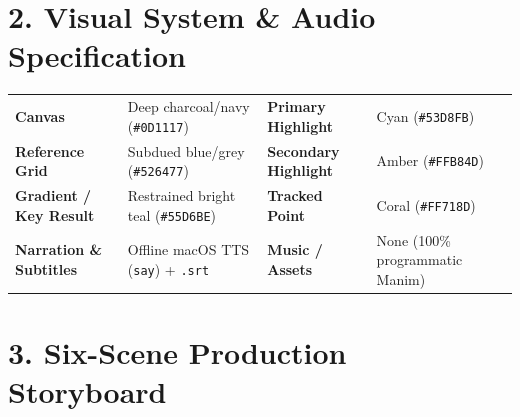 \documentclass[10pt,a4paper]{article}
\begin{document}
\section*{\color{slate}2. Visual System \& Audio Specification}
\begin{tabularx}{\textwidth}{@{}l X l X@{}}
\toprule
\textbf{Canvas} & Deep charcoal/navy (\texttt{\#0D1117}) & \textbf{Primary Highlight} & Cyan (\texttt{\#53D8FB}) \\
\textbf{Reference Grid} & Subdued blue/grey (\texttt{\#526477}) & \textbf{Secondary Highlight} & Amber (\texttt{\#FFB84D}) \\
\textbf{Gradient / Key Result} & Restrained bright teal (\texttt{\#55D6BE}) & \textbf{Tracked Point} & Coral (\texttt{\#FF718D}) \\
\textbf{Narration \& Subtitles} & Offline macOS TTS (\texttt{say}) + \texttt{.srt} & \textbf{Music / Assets} & None (100\% programmatic Manim) \\
\bottomrule
\end{tabularx}

\section*{\color{slate}3. Six-Scene Production Storyboard}
\end{document}
